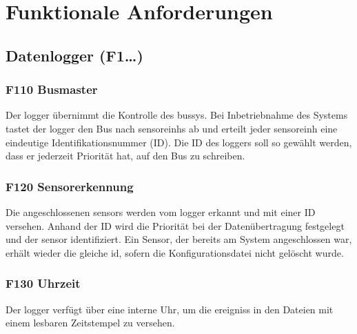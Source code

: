 %
%

\thispagestyle{empty}
\chapter{Funktionale Anforderungen}\label{chap.funktionale}
\section{Datenlogger (F1\ldots)}


\subsection{F110 Busmaster}
Der \gls{logger} übernimmt die Kontrolle des \gls{bussys}. Bei Inbetriebnahme des Systems tastet der \gls{logger} den Bus nach \glspl{sensoreinh} ab und erteilt jeder \gls{sensoreinh} eine eindeutige Identifikationsnummer (ID). Die ID des \gls{logger}s soll so gewählt werden, dass er jederzeit Priorität hat, auf den Bus zu schreiben.


\subsection{F120 Sensorerkennung}
Die angeschlossenen \glspl{sensor} werden vom \gls{logger} erkannt und mit einer ID versehen. Anhand der ID wird die Priorität bei der Datenübertragung festgelegt und der \gls{sensor} identifiziert. Ein Sensor, der bereits am System angeschlossen war, erhält wieder die gleiche \gls{id}, sofern die Konfigurationsdatei nicht gelöscht wurde.


\subsection{F130 Uhrzeit}
Der \gls{logger} verfügt über eine interne Uhr, um die \glspl{ereignis} in den Dateien mit einem lesbaren Zeitstempel zu versehen.


